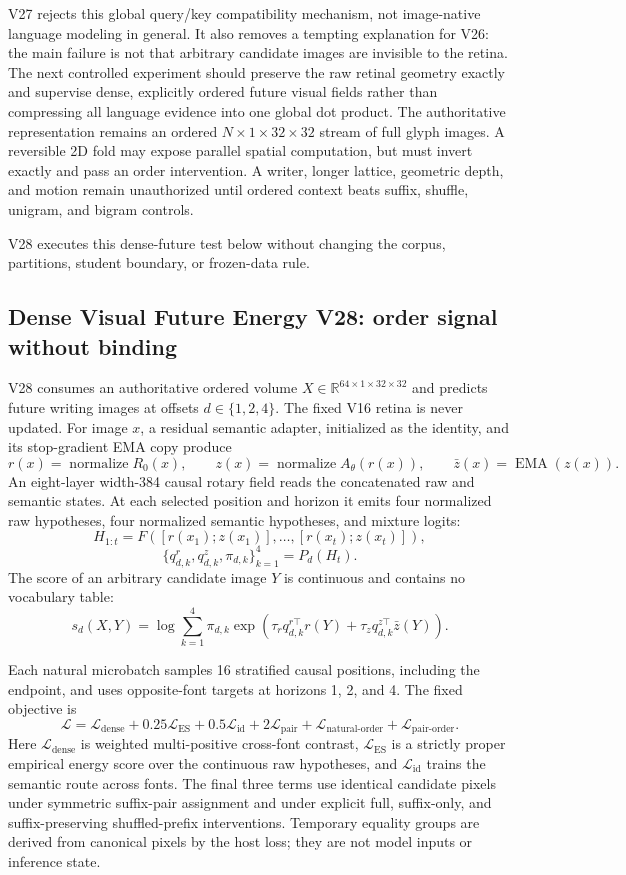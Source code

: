 \documentclass[11pt]{article}
\begin{document}
V27 rejects this global query/key compatibility mechanism, not image-native
language modeling in general. It also removes a tempting explanation for V26:
the main failure is not that arbitrary candidate images are invisible to the
retina. The next controlled experiment should preserve the raw retinal geometry
exactly and supervise dense, explicitly ordered future visual fields rather
than compressing all language evidence into one global dot product. The
authoritative representation remains an ordered
$N\times1\times32\times32$ stream of full glyph images. A reversible 2D fold
may expose parallel spatial computation, but must invert exactly and pass an
order intervention. A writer, longer lattice, geometric depth, and motion
remain unauthorized until ordered context beats suffix, shuffle, unigram, and
bigram controls.

V28 executes this dense-future test below without changing the corpus,
partitions, student boundary, or frozen-data rule.

\subsection{Dense Visual Future Energy V28: order signal without binding}

V28 consumes an authoritative ordered volume
$X\in\mathbb R^{64\times1\times32\times32}$ and predicts future writing images
at offsets $d\in\{1,2,4\}$. The fixed V16 retina is never updated. For image
$x$, a residual semantic adapter, initialized as the identity, and its
stop-gradient EMA copy produce
\[
r(x)=\operatorname{normalize}R_0(x),\qquad
z(x)=\operatorname{normalize}A_\theta(r(x)),\qquad
\bar z(x)=\operatorname{EMA}(z(x)).
\]
An eight-layer width-384 causal rotary field reads the concatenated raw and
semantic states. At each selected position and horizon it emits four normalized
raw hypotheses, four normalized semantic hypotheses, and mixture logits:
\[
H_{1:t}=F([r(x_1);z(x_1)],\ldots,[r(x_t);z(x_t)]),
\]
\[
\{q^r_{d,k},q^z_{d,k},\pi_{d,k}\}_{k=1}^{4}=P_d(H_t).
\]
The score of an arbitrary candidate image $Y$ is continuous and contains no
vocabulary table:
\[
s_d(X,Y)=\log\sum_{k=1}^{4}\pi_{d,k}
\exp\!\left(
\tau_r q_{d,k}^{r\top}r(Y)+
\tau_z q_{d,k}^{z\top}\bar z(Y)
\right).
\]

Each natural microbatch samples 16 stratified causal positions, including the
endpoint, and uses opposite-font targets at horizons 1, 2, and 4. The fixed
objective is
\[
\mathcal L=\mathcal L_{\mathrm{dense}}
+0.25\mathcal L_{\mathrm{ES}}
+0.5\mathcal L_{\mathrm{id}}
+2\mathcal L_{\mathrm{pair}}
+\mathcal L_{\mathrm{natural\text{-}order}}
+\mathcal L_{\mathrm{pair\text{-}order}}.
\]
Here $\mathcal L_{\mathrm{dense}}$ is weighted multi-positive cross-font
contrast, $\mathcal L_{\mathrm{ES}}$ is a strictly proper empirical energy
score over the continuous raw hypotheses, and $\mathcal L_{\mathrm{id}}$
trains the semantic route across fonts. The final three terms use identical
candidate pixels under symmetric suffix-pair assignment and under explicit
full, suffix-only, and suffix-preserving shuffled-prefix interventions.
Temporary equality groups are derived from canonical pixels by the host loss;
they are not model inputs or inference state.
\end{document}
